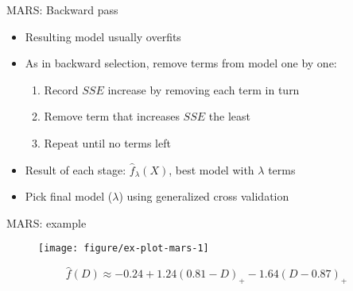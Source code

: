 \documentclass[handout]{beamer}
\begin{document}
\begin{frame}{MARS: Backward pass}
  \begin{itemize}[<+->]
    \item Resulting model usually overfits
    \item As in backward selection, remove terms from model one by one:
    \begin{enumerate}
      \item Record $SSE$ increase by removing each term in turn
      \item Remove term that increases $SSE$ the least
      \item Repeat until no terms left
    \end{enumerate}
    \item Result of each stage: $\hat{f}_{\lambda}(X)$, best model with $\lambda$ terms
    \item Pick final model ($\lambda$) using generalized cross validation 
  \end{itemize}

\end{frame}





\begin{frame}[t]{MARS: example}

\begin{figure}[!htbp]
\begin{center}
  \texttt{[image: figure/ex-plot-mars-1]}
\end{center}
\end{figure}
%
\begin{equation*}
  \label{eq:mars-eqn}
  \hat{f}(D) \approx -0.24 + 1.24 (0.81 - D)_{+} -1.64 (D - 0.87)_{+}
\end{equation*}

\end{frame}
\end{document}
